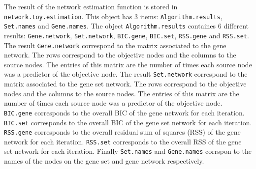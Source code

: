 \documentclass[12pt]{article}
\newcommand{\Robject}[1]{{\texttt{#1}}}
\begin{document}
The result of the network estimation function is stored in \Robject{network.toy.estimation}. This object has 3 items: \Robject{Algorithm.results}, \Robject{Set.names} and \Robject{Gene.names}. The object \Robject{Algorithm.results} containes 6 different results: \Robject{Gene.network}, \Robject{Set.network}, \Robject{BIC.gene}, \Robject{BIC.set}, \Robject{RSS.gene} and \Robject{RSS.set}. The result \Robject{Gene.network} correspond to the matrix associated to the gene network. The rows correspond to the objective nodes and the columns to the source nodes. The entries of this matrix are the number of times each source node was a predictor of the objective node. The result \Robject{Set.network} correspond to the matrix associated to the gene set network. The rows correspond to the objective nodes and the columns to the source nodes. The entries of this matrix are the number of times each source node was a predictor of the objective node. \Robject{BIC.gene} corresponds to the overall BIC of the gene network for each iteration. \Robject{BIC.set} corresponds to the overall BIC of the gene set network for each iteration. \Robject{RSS.gene} corresponds to the overall residual sum of squares (RSS) of the gene network for each iteration. \Robject{RSS.set} corresponds to the overall RSS of the gene set network for each iteration. Finally \Robject{Set.names} and \Robject{Gene.names} corrspon to the names of the nodes on the gene set and gene network respectively.
\end{document}
